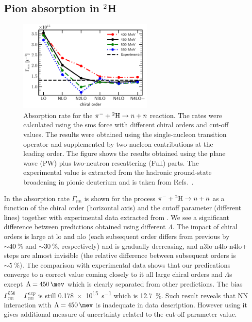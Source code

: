 \subsection{Pion absorption in $^2$H}


\begin{figure}[h]
        \begin{center}
        \includegraphics[width=0.6\textwidth]{PlotData/PION/Dalitz_maps/figures/Gamma_nn.pdf}
        \end{center}
        \caption{
            Absorption rate for the $\pi^- + {^2{\rm H}} \rightarrow n + n$ reaction.
            The rates were calculated using the \gls{sms} force with different chiral orders and cut-off values.
            The results were obtained using the single-nucleon transition operator and 
            supplemented by two-nucleon contributions at the leading order.
            The figure shows the results obtained using the plane wave (PW) plus
            two-neutron rescattering (Full) parts.
            The experimental value is extracted from the hadronic
            ground-state broadening in pionic deuterium and is taken from Refs.~\cite{Strauch2010,Strauch2011}.}
        \label{Gamma_nn}
    \end{figure}

    In  the absorption rate $\Gamma_{nn}$ is shown for the process $\pi^- + {^2{\rm H}} \rightarrow n + n$
    as a function of the chiral order (horizontal axis) and the cutoff parameter (different lines) 
    together with experimental data extracted from \cite{Strauch2010,Strauch2011}.
    We see a significant difference between
    predictions obtained using different $\Lambda$. The impact of chiral orders is large at \gls{lo}
    and \gls{nlo} (each subsequent order differs from previous 
    by $\sim\SI{40}{\percent}$ and $\sim\SI{30}{\percent}$, respectively) 
    and is gradually decreasing, and \gls{n3lo}-\gls{n4lo}-\gls{n4lo+} steps are almost invisible
    (the relative difference between subsequent orders is $\sim\SI{5}{\percent}$).
    The comparison with experimental data shows that our predications converge to a correct value coming 
    closely to it all large chiral orders and $\Lambda$s except $\Lambda = \SI{450}{\mev}$ 
    which is clearly separated from other predictions. The bias $\Gamma^{550}_{nn} - \Gamma^{exp}_{nn}$
    is still \SI{0.178e15}{s^{-1}} which is \SI{12.7}{\percent}.
    Such result reveals that NN interaction with $\Lambda = \SI{450}{\mev}$  is inadequate in data description. 
    However using it gives additional measure of uncertainty related to the cut-off parameter value.


